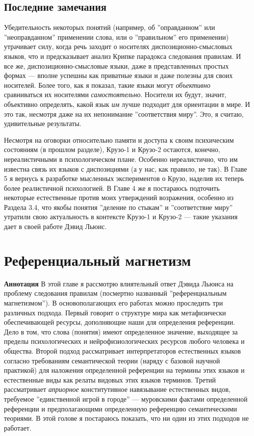 \documentclass[11pt]{book}
\begin{document}
\section{Последние замечания}

Убедительность некоторых понятий (например, об ''оправданном'' или ''неоправданном'' применении слова, или о ''правильном'' его применении) утрачивает силу, когда речь заходит о носителях диспозиционно-смысловых языков, что и предсказывает анализ Крипке парадокса следования правилам. И все же, диспозиционно-смысловые языки, даже в представленных простых формах --- вполне успешны как приватные языки и даже полезны для своих носителей. Более того, как я показал, такие языки могут \textit{объективно} сравниваться их носителями \textit{самостоятельно}. Носители их будут, значит, объективно определять, какой язык \textit{им} лучше подходит для ориентации в мире. И это так, несмотря даже на их непонимание ''соответствия миру''. Это, я считаю, удивительные результаты.

Несмотря на оговорки относительно памяти и доступа к своим психическим состояниям (в прошлом разделе), Крузо-1 и Крузо-2 остаются, конечно, нереалистичными в психологическом плане. Особенно нереалистично, что им известна связь их языков с диспозициями (а у нас, как правило, не так). В Главе 5 я вернусь к разработке мысленных экспериментов о Крузо, наделив их теперь более реалистичной психологией. В Главе 4 же я постараюсь подточить некоторые естественные против моих утверждений возражения, особенно из Раздела 3.4, что якобы понятия ''деление по стыкам'' и ''соответствие миру'' утратили свою актуальность в контексте Крузо-1 и Крузо-2 --- такие указания дает в своей работе Дэвид Льюис.

\chapter{Референциальный магнетизм}

\qquad

\textbf{Аннотация} \quad В этой главе я рассмотрю влиятельный ответ Дэвида Льюиса на проблему следования правилам (посмертно названный ''референциальным магнетизмом''). В основополагающих его работах можно проследить три различных подхода. Первый говорит о структуре мира как метафизически обеспечивающей ресурсы, дополняющие наши для определения референции. Дело в том, что слова (понятия) имеют определенное значение, выходящее за пределы психологических и нейрофизиологических ресурсов любого человека и общества. Второй подход рассматривает интерпретаторов естественных языков согласно требованиям семантической теории (наряду с базовой научной практикой) для наложения определенной референции на термины этих языков и естественные виды как релаты видовых этих языков терминов. Третий рассматривает \textit{априорное} конститутивное навязывание естественных видов, требуемое ''единственной игрой в городе'' --- муровскими фактами определенной референции и предполагающими определенную референцию семантическими теориями. В этой голове я постараюсь показать, что ни один из этих подходов не работает.
\end{document}

